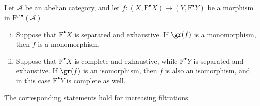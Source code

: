 \begin{proposition}\label{prop:gr-isom}
	Let $\mathcal{A}$ be an abelian category, and let
	$f:(X,\mathrm{F}^\bullet X)\to(Y,\mathrm{F}^\bullet Y)$ be a morphism in
	$\mathrm{Fil}^\bullet(\mathcal{A})$.
	\begin{enumerate}[(i)]
		\item Suppose that $\mathrm{F}^\bullet X$ is separated and exhaustive. If
		$\gr(f)$ is a monomorphism, then $f$ is a monomorphism.
		\item Suppose that $\mathrm{F}^\bullet X$ is complete and exhaustive,
		while $\mathrm{F}^\bullet Y$ is separated and exhaustive. If $\gr(f)$ is
		an isomorphism, then $f$ is also an isomorphism, and in this case
		$\mathrm{F}^\bullet Y$ is complete as well.
	\end{enumerate}
	The corresponding statements hold for increasing filtrations.
\end{proposition}
